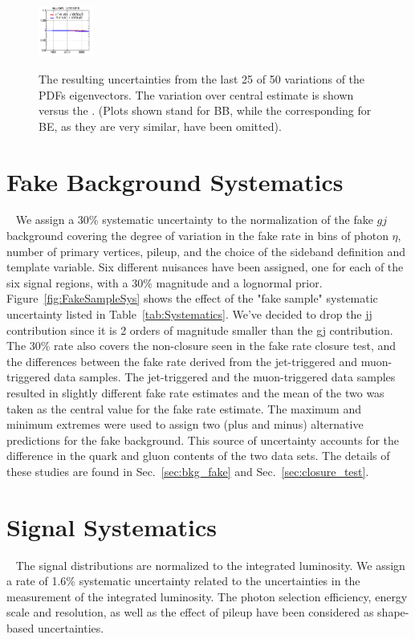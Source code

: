 \begin{figure}[!htbp]
{{\includegraphics[width=0.16\textwidth]{fig/spectra__pdf50_BB18_ADDGRW.png}\\}
\caption{The resulting uncertainties from the last 25 of 50 variations of the PDFs eigenvectors. 
The variation over central estimate is shown versus the \mgg. 
(Plots shown stand for BB, while the corresponding for BE, as they are very similar, have been omitted).
} 
\label{Fig:PDFs_Sys2} }
\end{figure}

\section{Fake Background Systematics}~\label{sec:fakeBKGSYS}
We assign a 30\% systematic uncertainty to the normalization of the fake $gj$ background covering the degree of variation in the fake rate in bins of photon $\eta$, number of primary vertices, pileup, and the choice of the sideband definition and template variable. Six different nuisances have been assigned, one for each of the six signal regions, with a 30\% magnitude and a lognormal prior. Figure~\ref{fig:FakeSampleSys} shows the effect of the "fake sample" systematic uncertainty listed in Table~\ref{tab:Systematics}. We've decided to drop the jj contribution since it is 2 orders of magnitude smaller than the gj contribution. The 30\% rate also covers the non-closure seen in the fake rate closure test, and the differences between the fake rate derived from the jet-triggered and muon-triggered data samples. The jet-triggered and the muon-triggered data samples resulted in slightly different fake rate estimates and the mean of the two was taken as the central value for the fake rate estimate. The maximum and minimum extremes were used to assign two (plus and minus) alternative predictions for the fake background. This source of uncertainty accounts for the difference in the quark and gluon contents of the two data sets. The details of these studies are found in Sec.~\ref{sec:bkg_fake} and Sec.~\ref{sec:closure_test}. 

\section{Signal Systematics}~\label{sec:sigSYS}
The signal distributions are normalized to the integrated luminosity. We assign a rate of 1.6\% systematic uncertainty related to the uncertainties in the measurement of the integrated luminosity. The photon selection efficiency, energy scale and resolution, as well as the effect of pileup have been considered as shape-based uncertainties. 



